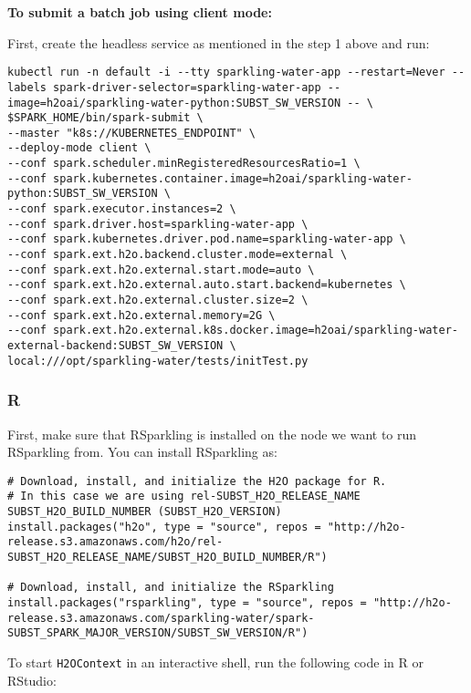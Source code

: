 \textbf{To submit a batch job using client mode:}

First, create the headless service as mentioned in the step 1 above and run:

\begin{lstlisting}[style=Bash]
kubectl run -n default -i --tty sparkling-water-app --restart=Never --labels spark-driver-selector=sparkling-water-app --image=h2oai/sparkling-water-python:SUBST_SW_VERSION -- \
$SPARK_HOME/bin/spark-submit \
--master "k8s://KUBERNETES_ENDPOINT" \
--deploy-mode client \
--conf spark.scheduler.minRegisteredResourcesRatio=1 \
--conf spark.kubernetes.container.image=h2oai/sparkling-water-python:SUBST_SW_VERSION \
--conf spark.executor.instances=2 \
--conf spark.driver.host=sparkling-water-app \
--conf spark.kubernetes.driver.pod.name=sparkling-water-app \
--conf spark.ext.h2o.backend.cluster.mode=external \
--conf spark.ext.h2o.external.start.mode=auto \
--conf spark.ext.h2o.external.auto.start.backend=kubernetes \
--conf spark.ext.h2o.external.cluster.size=2 \
--conf spark.ext.h2o.external.memory=2G \
--conf spark.ext.h2o.external.k8s.docker.image=h2oai/sparkling-water-external-backend:SUBST_SW_VERSION \
local:///opt/sparkling-water/tests/initTest.py
\end{lstlisting}

\subsubsection{R}

First, make sure that RSparkling is installed on the node we want to run RSparkling from.
You can install RSparkling as:

\begin{lstlisting}[style=R]
# Download, install, and initialize the H2O package for R.
# In this case we are using rel-SUBST_H2O_RELEASE_NAME SUBST_H2O_BUILD_NUMBER (SUBST_H2O_VERSION)
install.packages("h2o", type = "source", repos = "http://h2o-release.s3.amazonaws.com/h2o/rel-SUBST_H2O_RELEASE_NAME/SUBST_H2O_BUILD_NUMBER/R")

# Download, install, and initialize the RSparkling
install.packages("rsparkling", type = "source", repos = "http://h2o-release.s3.amazonaws.com/sparkling-water/spark-SUBST_SPARK_MAJOR_VERSION/SUBST_SW_VERSION/R")
\end{lstlisting}

To start \texttt{H2OContext} in an interactive shell, run the following code in R or RStudio:

